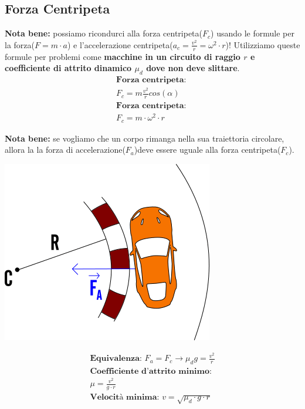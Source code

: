 \subsection{Forza Centripeta}
\textbf{Nota bene: } possiamo ricondurci alla forza centripeta($F_c$) usando le formule per la forza($F = m \cdot a$) e l'accelerazione centripeta($a_c = \frac{v^2}{r} = \omega^2 \cdot r $)! Utilizziamo queste formule per problemi come \textbf{macchine in un circuito di raggio $r$ e coefficiente di attrito dinamico $\mu_d$ dove non deve slittare}.
\\
\begin{gather*}
    \textbf{Forza centripeta: } \\ F_c = m \frac{v^2}{r} cos (\alpha) \\
    \textbf{Forza centripeta: } \\ F_c = m \cdot \omega^2 \cdot r
\end{gather*}

\textbf{Nota bene: } se vogliamo che un corpo rimanga nella sua traiettoria circolare, allora la la forza di accelerazione($F_a$)deve essere uguale alla forza centripeta($F_c$).

\begin{center}
\includegraphics[width=0.7 \linewidth]
{Dinamica/forza-centripeta.png}
\end{center}
\begin{gather*}
    \textbf{Equivalenza: } F_a = F_c \rightarrow \mu_d  g = \frac{v^2}{r} \\
    \textbf{Coefficiente d'attrito minimo: } \\ \mu = \frac{v^2}{g \cdot r} \\
    \textbf{Velocità minima: } v = \sqrt{\mu_d \cdot g \cdot r}
\end{gather*}